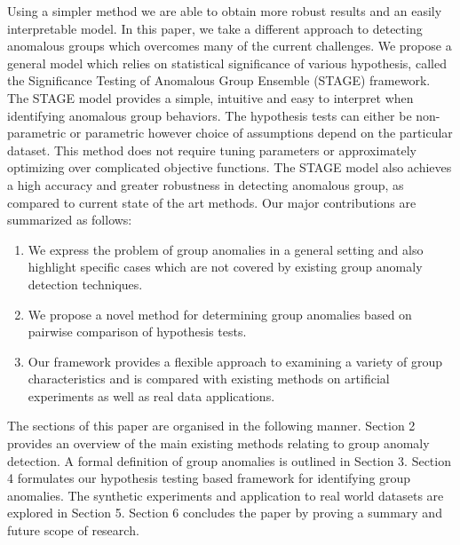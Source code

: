
Using a simpler method we are able to obtain more robust results and an easily interpretable model.
  In this paper, we take a different approach to detecting anomalous groups which overcomes many of the current challenges.  We propose a general model which relies on statistical significance of various hypothesis,  called the Significance Testing of Anomalous Group Ensemble (STAGE) framework. The STAGE model provides a simple, intuitive and easy to interpret when identifying anomalous group behaviors. The hypothesis tests can either be non-parametric or parametric however choice of assumptions depend on the particular dataset. This method does not require tuning parameters or approximately optimizing over complicated objective functions. The STAGE model also achieves a high accuracy and greater robustness in detecting anomalous group, as compared to current state of the art methods.
  Our major contributions are summarized as follows:
 \begin{enumerate}
   \item We express the problem of group anomalies in a general setting and also highlight specific cases which are not covered by existing  group anomaly detection techniques.
   \item We propose a novel method for determining group anomalies based on pairwise comparison of  hypothesis tests. 
 \item Our framework provides a flexible approach to examining a variety of group characteristics and is compared with existing methods on artificial experiments as well as real data applications.
 \end{enumerate}
 
 The sections of this paper are organised in the following manner. Section 2 provides an overview of the main existing methods relating to group anomaly detection. A formal definition of group anomalies is outlined in Section 3. Section 4 formulates our hypothesis testing based framework for identifying group anomalies. The synthetic experiments and application to real world datasets are explored in Section 5. Section 6 concludes the paper by proving a summary and future scope of research. 
 

 
 